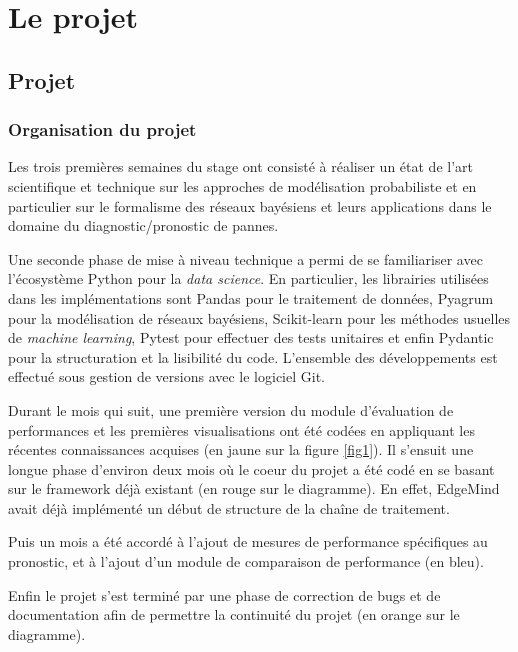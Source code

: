 \part{Le projet}

\chapter{Projet}
\section{Organisation du projet}

Les trois premières semaines du stage ont consisté à réaliser un état de l’art scientifique et technique sur les approches de modélisation probabiliste et en particulier sur le formalisme des réseaux bayésiens et leurs applications  dans le domaine du diagnostic/pronostic de pannes.

Une seconde phase de mise à niveau technique a permi de se familiariser avec  l’écosystème Python pour la \textit{data science}. En particulier, les librairies utilisées dans les implémentations sont Pandas pour le traitement de données, Pyagrum pour la modélisation de réseaux bayésiens, Scikit-learn pour les  méthodes usuelles de \textit{machine learning}, Pytest pour effectuer des tests unitaires et enfin Pydantic pour la structuration et la lisibilité du code. L’ensemble des développements est effectué sous gestion de versions avec le logiciel Git.

Durant le mois qui suit, une première version du module d’évaluation de performances et les premières visualisations ont été codées en appliquant les récentes connaissances acquises (en jaune sur la figure \ref{fig1}).
Il s’ensuit une longue phase d’environ deux mois où le coeur du projet a été codé en se basant sur le framework déjà existant (en rouge sur le diagramme). En effet, EdgeMind avait déjà implémenté un début de structure de la chaîne de traitement.

Puis un mois a été accordé à l’ajout de mesures de performance spécifiques au pronostic, et à l’ajout d’un module de comparaison de performance (en bleu).

Enfin le projet s’est terminé par une phase de correction de bugs et de documentation afin de permettre la continuité du projet (en orange sur le diagramme).

